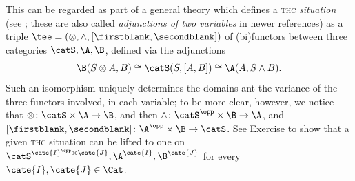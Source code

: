 \begin{remark}\label{tiaccaci}
This can be regarded as part of a general theory which defines a \textsc{thc} \emph{situation} (see \cite[\S \textbf{1.1}]{Gray1980}; these are also called \emph{adjunctions of two variables} in newer references) as a triple $\tee=(\otimes , \wedge, [\firstblank,\secondblank])$ of (bi)functors between three categories $\catS, \A, \B$, defined via the adjunctions
\[
\B(S\otimes A, B)\cong \catS(S, [A,B])\cong \A(A, S\land B).
\] 
Such an isomorphism uniquely determines the domains ant the variance of the three functors involved, in each variable; to be more clear, however, we notice that $\otimes \colon \catS\times \A\to \B$, and then $\land \colon \catS^\opp\times \B\to \A$, and $[\firstblank,\secondblank] \colon \A^\opp\times \B\to \catS$. See Exercise  to show that a given \textsc{thc} situation can be lifted to one on $\catS^{\cate{I}^\opp\times \cate{J}}, \A^\cate{I}, \B^\cate{J}$ for every $\cate{I},\cate{J}\in\Cat$.
\end{remark}
